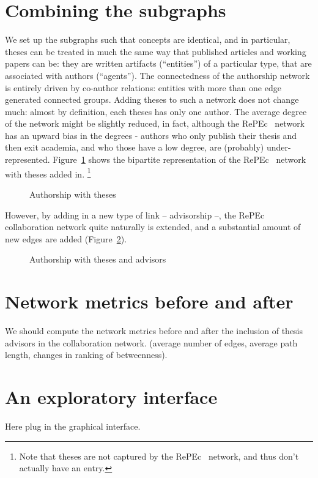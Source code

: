 \documentclass[x11names]{article}
\newcommand{\repec}{RePEc}
\begin{document}
\section{Combining the subgraphs}
\label{sec:combine}
We set up the subgraphs such that concepts are identical, and in particular, theses can be treated in much the same way that published articles and working papers can be: they are written artifacts (``entities'') of a particular type, that are associated with authors (``agents''). The connectedness of the authorship network is entirely driven by co-author relations: entities with more than one edge generated connected groups. Adding theses to such a network does not change much: almost by definition, each theses has only one author. The average degree of the network might be slightly reduced, in fact, although the \repec~ network has an upward bias in the degrees - authors who only publish their thesis and then exit academia, and who those have a low degree, are (probably) under-represented. Figure~\ref{fig:author:theses} shows the bipartite representation of the \repec~ network with theses added in.%
\footnote{Note that theses are not captured by the \repec~ network, and thus don't actually have an entry.}

\begin{figure}[ht]
\caption{Authorship with theses}\label{fig:author:theses}

\end{figure}

However, by adding in a new type of link -- advisorship --, the \repec~ collaboration network quite naturally is extended, and a substantial amount of new edges are added (Figure~\ref{fig:author:theses:complete}).
\begin{figure}[ht]
\caption{Authorship with theses and advisors}\label{fig:author:theses:complete}

\end{figure}

\section{Network metrics before and after}
\label{sec:metrics}

We should compute the network metrics before and after the inclusion of thesis advisors in the collaboration network. (average number of edges, average path length, changes in ranking of betweenness).

\section{An exploratory interface}
\label{sec:interface}
Here plug in the graphical interface.
\end{document}
